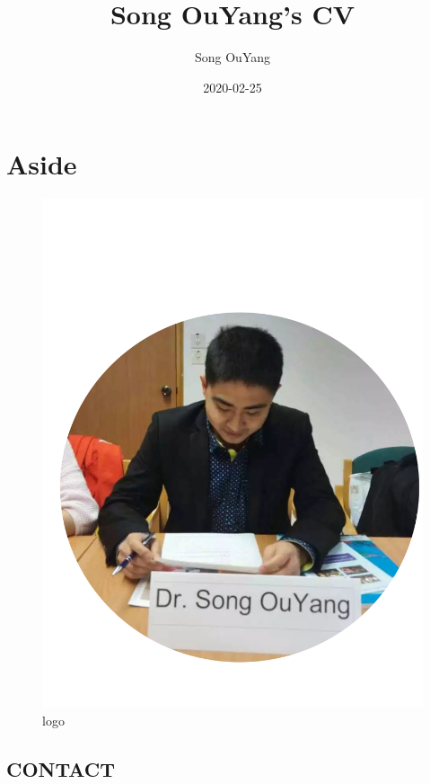 \documentclass[]{article}
\title{Song OuYang's CV}
\author{Song OuYang}
\date{2020-02-25}
\begin{document}
\maketitle

\hypertarget{aside}{%
\section{Aside}\label{aside}}

\begin{figure}
\centering
\includegraphics[width=1\textwidth,height=\textheight]{psb.png}
\caption{logo}
\end{figure}

\hypertarget{contact}{%
\subsection{CONTACT}\label{contact}}
\end{document}
